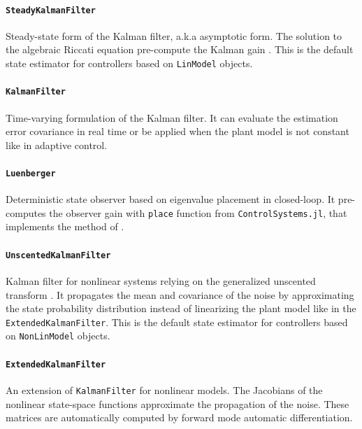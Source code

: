 \paragraph{\textnormal{\texttt{SteadyKalmanFilter}}}
Steady-state form of the Kalman filter, a.k.a asymptotic form. The solution to the algebraic Riccati equation pre-compute the Kalman gain \citep{simon}. This is the default state estimator for controllers based on \texttt{LinModel} objects.

\paragraph{\textnormal{\texttt{KalmanFilter}}}
Time-varying formulation of the Kalman filter. It can evaluate the estimation error covariance in real time or be applied when the plant model is not constant like in adaptive control.

\paragraph{\textnormal{\texttt{Luenberger}}}
Deterministic state observer based on eigenvalue placement in closed-loop. It pre-computes the observer gain with \texttt{place} function from \texttt{ControlSystems.jl}, that implements the method of \citet{placePoles}.

\paragraph{\textnormal{\texttt{UnscentedKalmanFilter}}}
Kalman filter for nonlinear systems relying on the generalized unscented transform \citep{simon}. It propagates the mean and covariance of the noise by approximating the state probability distribution instead of linearizing the plant model like in the \texttt{ExtendedKalmanFilter}. This is the default state estimator for controllers based on \texttt{NonLinModel} objects.

\paragraph{\textnormal{\texttt{ExtendedKalmanFilter}}}
An extension of \texttt{KalmanFilter} for nonlinear models. The Jacobians of the nonlinear state-space functions approximate the propagation of the noise. These matrices are automatically computed by forward mode automatic differentiation.

